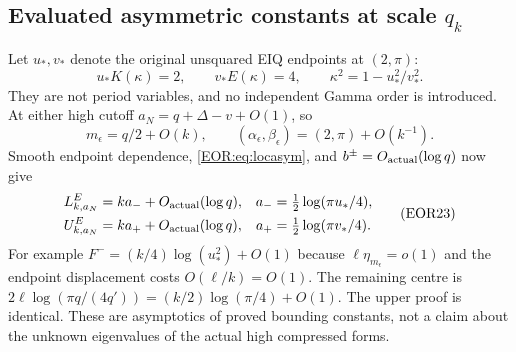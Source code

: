 \documentclass[11pt,a4paper]{article}
\begin{document}
\subsection{Evaluated asymmetric constants at scale $q_k$}
Let $u_*,v_*$ denote the original unsquared EIQ endpoints at $(2,\pi)$:
\begin{equation}
 u_*K(\kappa)=2,\qquad v_*E(\kappa)=4,\qquad
 \kappa^2=1-u_*^2/v_*^2.
 \label{EOR:eq:limitendpoints}
\tag{EOR22}
\end{equation}
They are not period variables, and no independent Gamma order is introduced.
At either high cutoff $a_N=q+\Delta-v+O(1)$, so
\[
 m_\epsilon=q/2+O(k),\qquad
 (\alpha_\epsilon,\beta_\epsilon)=(2,\pi)+O(k^{-1}).
\]
Smooth endpoint dependence, \eqref{EOR:eq:locasym}, and
$b^\pm=O_{\rm actual}(\log q)$ now give
\begin{equation}
\begin{aligned}
 L_{k,a_N}^{E}&=k a_-+O_{\rm actual}(\log q),
      &a_-&=\tfrac12\log(\pi u_*/4),\\
 U_{k,a_N}^{E}&=k a_++O_{\rm actual}(\log q),
      &a_+&=\tfrac12\log(\pi v_*/4).
\end{aligned}\label{EOR:eq:highasym}
\tag{EOR23}
\end{equation}
For example $F^-=(k/4)\log(u_*^2)+O(1)$ because
$\ell\eta_{m_\epsilon}=o(1)$ and the endpoint displacement costs
$O(\ell/k)=O(1)$. The remaining centre is
$2\ell\log(\pi q/(4q'))=(k/2)\log(\pi/4)+O(1)$.
The upper proof is identical. These are asymptotics of proved bounding constants,
not a claim about the unknown eigenvalues of the actual high compressed forms.
\end{document}
